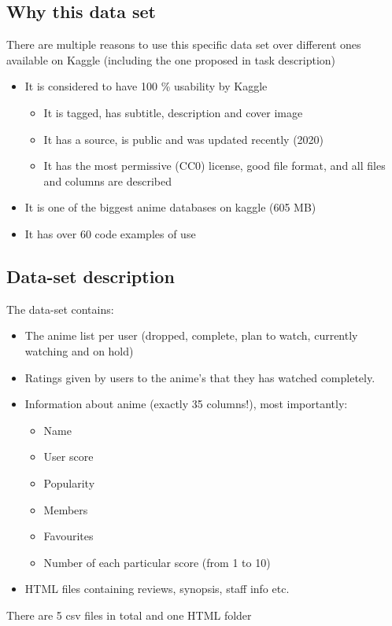 \documentclass[12pt]{article}
\begin{document}
\subsection{Why this data set}
There are multiple reasons to use this specific data set over different ones available on Kaggle (including the one proposed in task description) \\ 
\begin{itemize}
\item It is considered to have 100 \% usability by Kaggle
\begin{itemize}
\item It is tagged, has subtitle, description and cover image
\item It has a source, is public and was updated recently (2020)
\item It has the most permissive (CC0) license, good file format, and all files and columns are described
\end{itemize}
\item It is one of the biggest anime databases on kaggle (605 MB)
\item It has over 60 code examples of use
\end{itemize}
\subsection{Data-set description}

The data-set contains: 
\begin{itemize}
    \item The anime list per user (dropped, complete, plan to watch, currently watching and on hold)
    \item Ratings given by users to the anime's that they has watched completely.
    \item Information about anime (exactly 35 columns!), most importantly: 
    \begin{itemize}
        \item Name
        \item User score 
        \item Popularity
        \item Members
        \item Favourites
        \item Number of each particular score (from 1 to 10)
    \end{itemize}
    \item HTML files containing reviews, synopsis, staff info etc.
\end{itemize}
There are 5 csv files in total and one HTML folder 
\end{document}
